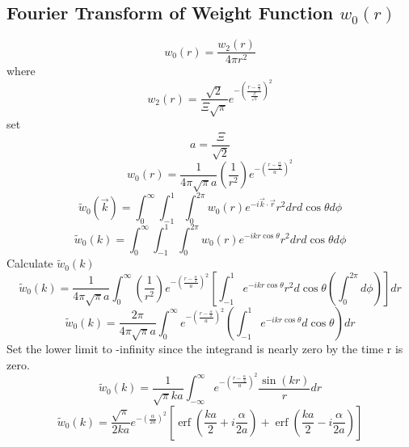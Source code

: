 \documentclass[letterpaper,twocolumn,amsmath,amssymb,prb]{revtex4-1}
\begin{document}
\begin{widetext}
\subsection{Fourier Transform of Weight Function $w_0(r)$}
\begin{equation}{w_0(r)=\frac{w_2(r)}{4{\pi}r^2}}\end{equation}
where
\begin{equation}{w_2(r)=\frac{\sqrt{2}}{\Xi\sqrt{\pi}}e^{-\left(\frac{r-\frac{\alpha}{2}}{\frac{\Xi}{\sqrt{2}}}\right)^2}}\end{equation}
set 
\begin{equation}{a=\frac{\Xi}{\sqrt{2}}}\end{equation}
\begin{equation}{w_0(r)=\frac{1}{4{\pi}\sqrt{\pi}a}\left(\frac{1}{r^2}\right)e^{-\left(\frac{r-\frac{\alpha}{2}}{a}\right)^2}}\end{equation}
\begin{equation}{\widetilde{w}_0(\vec{k})=\int_{0}^{\infty}\int_{-1}^{1}\int_{0}^{2\pi}w_0(r)e^{-i\vec{k}\cdot{\vec{r}}}r^2d{r}d{\cos\theta}d{\phi}}\end{equation}
\begin{equation}{\widetilde{w}_0(k)=\int_{0}^{\infty}\int_{-1}^{1}\int_{0}^{2\pi}w_0(r)e^{-ikr\cos\theta}r^2d{r}d{\cos\theta}d{\phi}}\end{equation}
\[{}\]
Calculate $\widetilde{w}_0(k)$ 
\begin{equation}{\widetilde{w}_0(k)=\frac{1}{4{\pi}\sqrt{\pi}a}\int_{0}^{\infty}\left(\frac{1}{r^2}\right)e^{-\left(\frac{r-\frac{\alpha}{2}}{a}\right)^2}\left[\int_{-1}^{1}e^{-ikr\cos\theta}r^2d{\cos\theta}\left(\int_{0}^{2\pi}d{\phi}\right)\right]d{r}}\end{equation}
\[{}\]
\begin{equation}{\widetilde{w}_0(k)=\frac{2\pi}{4{\pi}\sqrt{\pi}a}\int_{0}^{\infty}e^{-\left(\frac{r-\frac{\alpha}{2}}{a}\right)^2}\left(\int_{-1}^{1}e^{-ikr\cos\theta}d{\cos\theta}\right)d{r}}\end{equation}
\[{}\]
Set the lower limit to -infinity since the integrand is nearly zero by the time r is zero. 
\begin{displaymath}{\widetilde{w}_0(k)=\frac{1}{\sqrt{\pi}ka}\int_{-\infty}^{\infty}e^{-\left(\frac{r-\frac{\alpha}{2}}{a}\right)^2}\frac{\sin(kr)}{r}d{r}}\end{displaymath}
\[{}\]
\begin{equation}{\widetilde{w}_0(k)=\frac{\sqrt{\pi}}{2ka}e^{-\left(\frac{\alpha}{2a}\right)^2}\left[\operatorname{erf}\left(\frac{ka}{2}+i\frac{\alpha}{2a}\right)+\operatorname{erf}\left(\frac{ka}{2}-i\frac{\alpha}{2a}\right)\right]}\end{equation}

\end{widetext}
\end{document}
